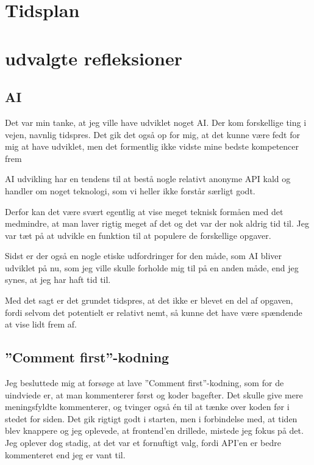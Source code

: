 \documentclass{report}
\begin{document}
\chapter{Tidsplan}



\chapter{udvalgte refleksioner}

\section{AI}
Det var min tanke, at jeg ville have udviklet noget AI. Der kom forskellige ting i vejen, navnlig tidspres. Det gik det også op for mig, at det kunne være fedt for mig at have udviklet, men det formentlig ikke vidste mine bedste kompetencer frem\par{}
AI udvikling har en tendens til at bestå nogle relativt anonyme API kald og handler om noget teknologi, som vi heller ikke forstår særligt godt.\par{}
Derfor kan det være svært egentlig at vise meget teknisk formåen med det medmindre, at man laver rigtig meget af det og det var der nok aldrig tid til. Jeg var tæt på at udvikle en funktion til at populere de forskellige opgaver.\par{}
Sidst er der også en nogle etiske udfordringer for den måde, som AI bliver udviklet på nu, som jeg ville skulle forholde mig til på en anden måde, end jeg synes, at jeg har haft tid til.\par{}
Med det sagt er det grundet tidspres, at det ikke er blevet en del af opgaven, fordi selvom det potentielt er relativt nemt, så kunne det have være spændende at vise lidt frem af.

\section{”Comment first”-kodning}
Jeg besluttede mig at forsøge at lave ”Comment first”-kodning, som for de uindviede er, at man kommenterer først og koder bagefter.  Det skulle give mere meningsfyldte kommenterer, og tvinger også én til at tænke over koden før i stedet for siden.
Det gik rigtigt godt i starten, men i forbindelse med, at tiden blev knappere og jeg oplevede, at frontend’en drillede, mistede jeg fokus på det.
Jeg oplever dog stadig, at det var et fornuftigt valg, fordi API’en er bedre kommenteret end jeg er vant til.
\end{document}
